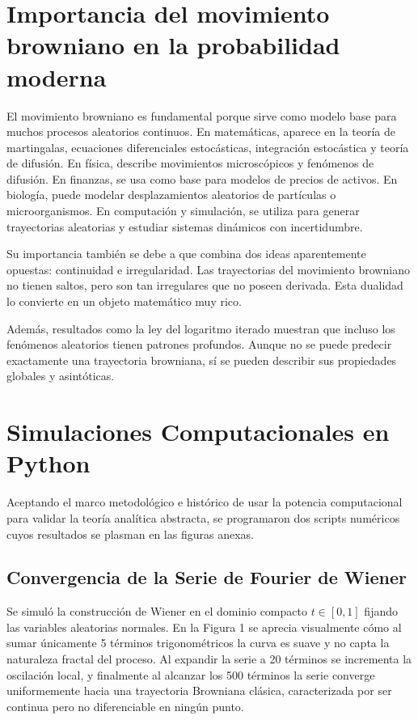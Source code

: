 \documentclass[12pt]{article}
\begin{document}
\section{Importancia del movimiento browniano en la probabilidad moderna}

El movimiento browniano es fundamental porque sirve como modelo base para muchos procesos aleatorios continuos. En matemáticas, aparece en la teoría de martingalas, ecuaciones diferenciales estocásticas, integración estocástica y teoría de difusión. En física, describe movimientos microscópicos y fenómenos de difusión. En finanzas, se usa como base para modelos de precios de activos. En biología, puede modelar desplazamientos aleatorios de partículas o microorganismos. En computación y simulación, se utiliza para generar trayectorias aleatorias y estudiar sistemas dinámicos con incertidumbre.

Su importancia también se debe a que combina dos ideas aparentemente opuestas: continuidad e irregularidad. Las trayectorias del movimiento browniano no tienen saltos, pero son tan irregulares que no poseen derivada. Esta dualidad lo convierte en un objeto matemático muy rico.

Además, resultados como la ley del logaritmo iterado muestran que incluso los fenómenos aleatorios tienen patrones profundos. Aunque no se puede predecir exactamente una trayectoria browniana, sí se pueden describir sus propiedades globales y asintóticas.

\newpage


\section{Simulaciones Computacionales en Python}
Aceptando el marco metodológico e histórico de usar la potencia computacional para validar la teoría analítica abstracta, se programaron dos scripts numéricos cuyos resultados se plasman en las figuras anexas.



\subsection{Convergencia de la Serie de Fourier de Wiener}
Se simuló la construcción de Wiener en el dominio compacto $t\in[0,1]$ fijando las variables aleatorias normales. En la Figura 1 se aprecia visualmente cómo al sumar únicamente 5 términos trigonométricos la curva es suave y no capta la naturaleza fractal del proceso. Al expandir la serie a 20 términos se incrementa la oscilación local, y finalmente al alcanzar los 500 términos la serie converge uniformemente hacia una trayectoria Browniana clásica, caracterizada por ser continua pero no diferenciable en ningún punto.
\end{document}
